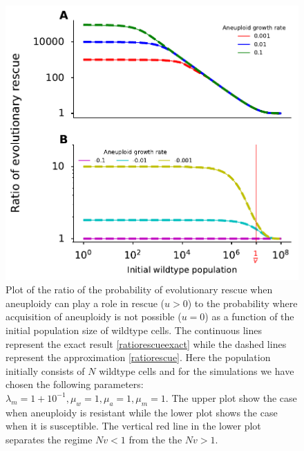 \documentclass[12pt]{extarticle}
\begin{document}
\begin{figure}[!t]
 \vspace*{1\baselineskip}
\includegraphics[width=1\textwidth]{Figures/RatioEvolRescuePopulationSize.pdf}
\caption{Plot of the ratio of the probability of evolutionary rescue when aneuploidy can play a role in rescue ($u>0$) to the probability where acquisition of aneuploidy is not possible ($u=0$) as a function of the initial population size of wildtype cells. The continuous lines represent the exact result \eqref{ratiorescueexact} while the dashed lines represent the approximation \eqref{ratiorescue}.  Here the population initially consists of $N$ wildtype cells and for the simulations we have chosen the following parameters: $\lambda_m=1+10^{-1},\mu_w=1,\mu_a=1,\mu_m=1$. The upper plot show the case when aneuploidy is resistant while the lower plot shows the case when it is susceptible. The vertical red line in the lower plot separates the regime $Nv<1$ from the the $Nv>1$.}
\label{RatioEvolRescuePopulationSize}
\end{figure}
\end{document}
